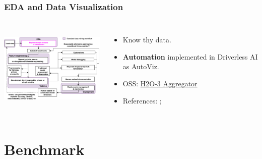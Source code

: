 \documentclass[11pt,
               aspectratio=169,
               hyperref={colorlinks}
               ]{beamer}
\begin{document}
		\begin{frame}
		
			\frametitle{EDA and Data Visualization}		
			
			\begin{columns}
	
				\centering
				\includegraphics[height=120pt]{img/eda.png}
				
				\vspace{-5pt}
				\begin{itemize}
					\item Know thy data.
					\item \textbf{Automation} implemented in Driverless AI as AutoViz.
					\item OSS: \href{http://docs.h2o.ai/h2o/latest-stable/h2o-docs/data-science/aggregator.html}{H2O-3 Aggregator}
					\item References: ; 
				\end{itemize}
				
			\end{columns}
		
		\end{frame}

	\section{Benchmark}
	
\end{document}
